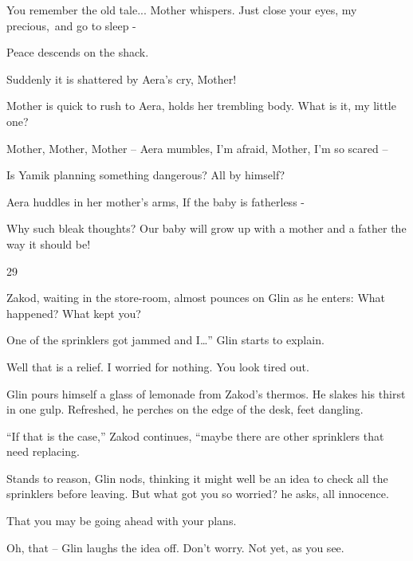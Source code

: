 \documentclass[letterpaper]{article}
\begin{document}
{\textquotedbl}You remember the old tale...{\textquotedbl} Mother whispers. {\textquotedbl}Just close your eyes, my
precious,~and go to sleep -{\textquotedbl} 

Peace descends on the shack. 

Suddenly it is shattered by Aera's cry, {\textquotedbl}Mother!{\textquotedbl} 

Mother is quick to rush to Aera, holds her trembling body. {\textquotedbl}What is it, my little one?{\textquotedbl} 

{\textquotedbl}Mother, Mother, Mother --{\textquotedbl} Aera mumbles, {\textquotedbl}I'm afraid, Mother, I'm so scared
--{\textquotedbl} 

{\textquotedbl}Is Yamik planning something dangerous? All by himself?{\textquotedbl} 

Aera huddles in her mother's arms, {\textquotedbl}If the baby is fatherless -{\textquotedbl}

{\textquotedbl}Why such bleak thoughts? Our baby will grow up with a mother and a father the way it should
be!{\textquotedbl}


\bigskip

29~~ 

Zakod, waiting in the store-room, almost pounces on Glin as he enters: {\textquotedbl}What happened? What kept
you?{\textquotedbl} 

{\textquotedbl}One of the sprinklers got jammed and I{\dots}'' Glin starts to explain. 

{\textquotedbl}Well that is a relief. I worried for nothing. You look tired out.{\textquotedbl} 

Glin pours himself a glass of lemonade from Zakod's thermos. He{ }slakes his
thirst in one gulp. Refreshed, he perches on the edge of the desk, feet dangling. 

{}``If that is the case,'' Zakod continues, ``maybe there are other sprinklers that need replacing.{\textquotedbl} 

{\textquotedbl}Stands to reason,{\textquotedbl} Glin nods, thinking it might well be an idea to check all the sprinklers
before leaving. {\textquotedbl}But what got you so worried?{\textquotedbl} he asks, all innocence. 

{\textquotedbl}That you may be going ahead with your plans.{\textquotedbl} 

{\textquotedbl}Oh, that -- {\textquotedbl} Glin laughs the idea off. {\textquotedbl}Don't worry. Not yet, as you
see.{\textquotedbl} 
\end{document}
